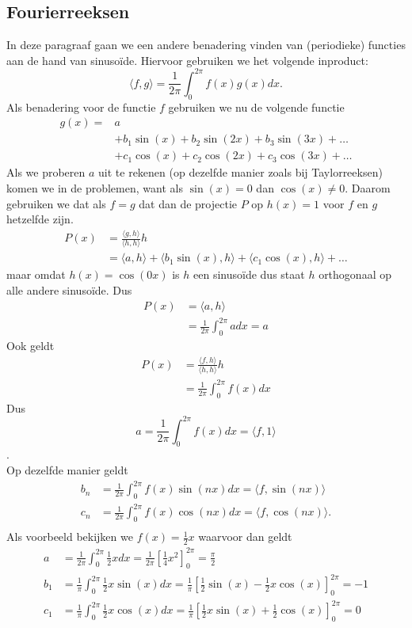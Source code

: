 \documentclass[../../main.tex]{subfiles}
\begin{document}
\subsection*{Fourierreeksen}
In deze paragraaf gaan we een andere benadering vinden van (periodieke) functies aan de hand van sinusoïde. Hiervoor gebruiken we het volgende inproduct: \[\langle f,g\rangle=\frac{1}{2\pi}\int_{0}^{2\pi} f(x)g(x)dx.\]
Als benadering voor de functie $f$ gebruiken we nu de volgende functie 
\begin{align*}
    g(x)=&a\\
    &+b_1\sin(x)+b_2\sin(2x)+b_3\sin(3x)+\ldots\\
    &+c_1\cos(x)+c_2\cos(2x)+c_3\cos(3x)+\ldots
\end{align*}
Als we proberen $a$ uit te rekenen (op dezelfde manier zoals bij Taylorreeksen) komen we in de problemen, want als $\sin(x)=0$ dan $\cos(x)\neq 0$. 
Daarom gebruiken we dat als $f=g$ dat dan de projectie $P$ op $h(x)=1$ voor $f$ en $g$ hetzelfde zijn.
\begin{align*}
    P(x)&=\frac{\langle g,h\rangle}{\langle h,h\rangle}h\\
    &=\langle a,h\rangle+\langle b_1\sin(x),h\rangle+\langle c_1\cos(x),h\rangle+\ldots
\end{align*}
maar omdat $h(x)=\cos(0x)$ is $h$ een sinusoïde dus staat $h$ orthogonaal op alle andere sinusoïde. Dus\\
\begin{align*}
    P(x)&=\langle a,h\rangle\\
    &=\frac{1}{2\pi}\int_0^{2\pi}adx=a
\end{align*}
Ook geldt \begin{align*}
    P(x)&=\frac{\langle f,h\rangle}{\langle h,h\rangle}h\\
    &=\frac{1}{2\pi}\int_0^{2\pi}f(x)dx
\end{align*}
Dus $$a=\frac{1}{2\pi}\int_0^{2\pi}f(x)dx=\langle f,1\rangle$$.\\
Op dezelfde manier geldt\begin{align*}
     b_n&=\frac{1}{2\pi}\int_0^{2\pi}f(x)\sin(nx)dx=\langle f,\sin(nx)\rangle\\ 
     c_n&=\frac{1}{2\pi}\int_0^{2\pi}f(x)\cos(nx)dx=\langle f,\cos(nx)\rangle.\\
     \end{align*}
Als voorbeeld bekijken we $f(x)=\frac{1}{2}x$ waarvoor dan geldt 
\begin{align*}
    a&=\frac{1}{2\pi}\int_0^{2\pi}\frac{1}{2}xdx=\frac{1}{2\pi}\left[\frac{1}{4}x^2\right]_0^{2\pi}=\frac{\pi}{2}\\
    b_1&=\frac{1}{\pi}\int_0^{2\pi}\frac{1}{2}x\sin(x)dx=\frac{1}{\pi}\left[\frac{1}{2}\sin(x)-\frac{1}{2}x\cos(x)\right]_0^{2\pi}=-1\\
    c_1&=\frac{1}{\pi}\int_0^{2\pi}\frac{1}{2}x\cos(x)dx=\frac{1}{\pi}\left[\frac{1}{2}x\sin(x)+\frac{1}{2}\cos(x)\right]_0^{2\pi}=0
\end{align*}
\end{document}

